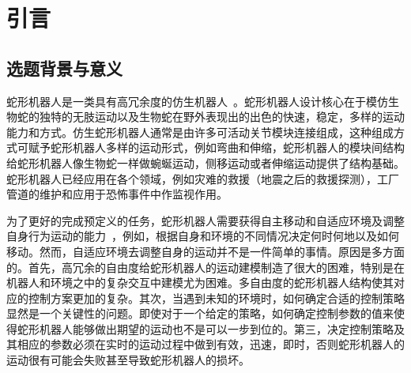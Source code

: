 
\chapter{引言}
\label{cha:introduction}
\section{选题背景与意义}
\label{sec:background}
蛇形机器人是一类具有高冗余度的仿生机器人~\cite{Chirikjian1995The}。蛇形机器人设计核心在于模仿生物蛇的独特的无肢运动以及生物蛇在野外表现出的出色的快速，稳定，多样的运动能力和方式。仿生蛇形机器人通常是由许多可活动关节模块连接组成，这种组成方式可赋予蛇形机器人多样的运动形式，例如弯曲和伸缩，蛇形机器人的模块间结构给蛇形机器人像生物蛇一样做蜿蜒运动，侧移运动或者伸缩运动提供了结构基础。蛇形机器人已经应用在各个领域，例如灾难的救援（地震之后的救援探测），工厂管道的维护和应用于恐怖事件中作监视作用。

为了更好的完成预定义的任务，蛇形机器人需要获得自主移动和自适应环境及调整自身行为运动的能力~\cite{Liljeb2013Snake}，例如，根据自身和环境的不同情况决定何时何地以及如何移动。然而，自适应环境去调整自身的运动并不是一件简单的事情。原因是多方面的。首先，高冗余的自由度给蛇形机器人的运动建模制造了很大的困难，特别是在机器人和环境之中的复杂交互中建模尤为困难。多自由度的蛇形机器人结构使其对应的控制方案更加的复杂。其次，当遇到未知的环境时，如何确定合适的控制策略显然是一个关键性的问题。即使对于一个给定的策略，如何确定控制参数的值来使得蛇形机器人能够做出期望的运动也不是可以一步到位的。第三，决定控制策略及其相应的参数必须在实时的运动过程中做到有效，迅速，即时，否则蛇形机器人的运动很有可能会失败甚至导致蛇形机器人的损坏。

